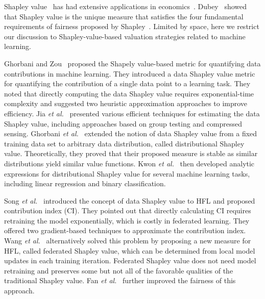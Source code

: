 Shapley value~\cite{shapley201617} has had extensive applications in economics~\cite{gul1989bargaining}. Dubey~\cite{dubey1975uniqueness} showed that Shapley value is the unique measure that satisfies the four fundamental requirements of fairness proposed by Shapley~\cite{shapley201617}. Limited by space, here we restrict our discussion to Shapley-value-based valuation strategies related to machine learning. 

Ghorbani and Zou~\cite{ghorbani2019data} proposed the Shapely value-based metric for quantifying data contributions in machine learning. They introduced a data Shapley value metric for quantifying the contribution of a single data point to a learning task. They noted that directly computing the data Shapley value requires exponential-time complexity and suggested two heuristic approximation approaches to improve efficiency. Jia \textit{et al.}~\cite{jia2019towards} presented various efficient techniques for estimating the data Shapley value, including approaches based on group testing and compressed sensing. Ghorbani \textit{et al.}~\cite{ghorbani2020distributional} extended the notion of data Shapley value from a fixed training data set to arbitrary data distribution, called distributional Shapley value. Theoretically, they proved that their proposed measure is stable as similar distributions yield similar value functions. Kwon \textit{et al.}~\cite{kwon2021efficient} then developed analytic expressions for distributional Shapley value for several machine learning tasks, including linear regression and binary classification.

Song \textit{et al.}~\cite{song2019profit} introduced the concept of data Shapley value to HFL and proposed contribution index (CI). They pointed out that directly calculating CI requires retraining the model exponentially, which is costly in federated learning. They offered two gradient-based techniques to approximate the contribution index. Wang \textit{et al.}~\cite{wang2020principled} alternatively solved this problem by proposing a new measure for HFL, called federated Shapley value, which can be determined from local model updates in each training iteration. Federated Shapley value does not need model retraining and preserves some but not all of the favorable qualities of the traditional Shapley value. Fan \textit{et al.}~\cite{fan2021improving} further improved the fairness of this approach. 

